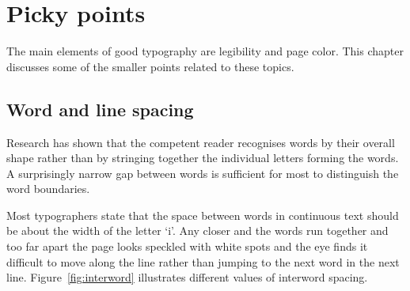 \documentclass[10pt,letterpaper,extrafontsizes]{memoir}
\begin{document}
\chapter{Picky points}
\let\footnoterule\oldfootnoterule

    The main elements of good typography are legibility 
and page color.
This chapter discusses some of the smaller points related to 
these topics.

\section{Word and line spacing}

    Research has shown that the competent reader recognises words by
their overall shape rather than by stringing together the individual letters
forming the words. A surprisingly narrow gap between words
is sufficient for most to distinguish the word boundaries.

    Most typographers state that the space between 
words
 in continuous
text should be about the width of the letter `i'. Any closer and the
words run together and too far apart the page looks speckled with white
spots and the eye finds it difficult to move along the line rather than
jumping to the next word in the next line. 
    Figure~\ref{fig:interword} illustrates different values of interword
spacing.
\end{document}
